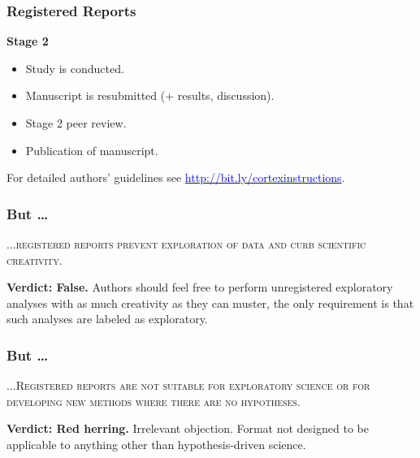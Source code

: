 \documentclass{beamer}
\begin{document}
\begin{frame}
\frametitle{Registered Reports}

\begin{large}


\textbf{Stage 2}
\begin{itemize}
 \item Study is conducted. 
\pause \item Manuscript is resubmitted (+ results, discussion).
\begin{itemize}
\end{itemize}
\pause \item Stage 2 peer review. %
\pause \item Publication of manuscript. \\[20pt]
\end{itemize}



For detailed authors' guidelines see \href{http://bit.ly/cortexinstructions}{\textcolor{blue}{http://bit.ly/cortexinstructions}}.
\end{large}

\end{frame}



\begin{frame}
\frametitle{But \dots}

\textsc{...registered reports prevent exploration of data and curb scientific creativity.}\\[12pt]

\pause

\textbf{Verdict: False.} Authors should feel free to perform unregistered exploratory analyses with as much creativity as they can muster, the only requirement is that such analyses are labeled as exploratory. 


\end{frame}
\begin{frame}
\frametitle{But \dots}

\textsc{...Registered reports are not suitable for exploratory science or for developing new methods where there are no hypotheses.}\\[12pt]

\pause

\textbf{Verdict: Red herring.} Irrelevant objection. Format not designed to be applicable to anything other than hypothesis-driven science.  

\end{frame}
\end{document}
